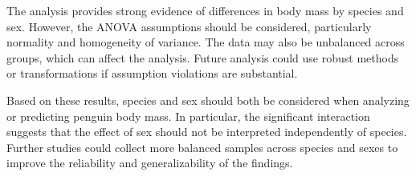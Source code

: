 \documentclass[
  11pt,
]{article}
\begin{document}
The analysis provides strong evidence of differences in body mass by
species and sex. However, the ANOVA assumptions should be considered,
particularly normality and homogeneity of variance. The data may also be
unbalanced across groups, which can affect the analysis. Future analysis
could use robust methods or transformations if assumption violations are
substantial.

Based on these results, species and sex should both be considered when
analyzing or predicting penguin body mass. In particular, the
significant interaction suggests that the effect of sex should not be
interpreted independently of species. Further studies could collect more
balanced samples across species and sexes to improve the reliability and
generalizability of the findings.
\end{document}
